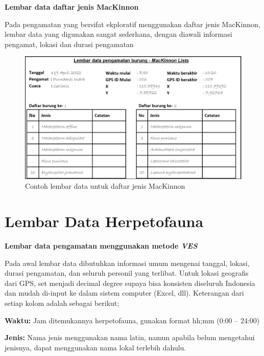 \documentclass[
]{book}
\begin{document}
\textbf{Lembar data daftar jenis MacKinnon}

Pada pengamatan yang bersifat ekploratif menggunakan daftar jenis MacKinnon, lembar data yang digunakan sangat sederhana, dengan diawali informasi pengamat, lokasi dan durasi pengamatan

\begin{figure}

{\centering \includegraphics[width=1\linewidth]{images/ldp_ml} 

}

\caption{Contoh lembar data untuk daftar jenis MacKinnon}\label{fig:ldpml}
\end{figure}

\hypertarget{lembar-data-herpetofauna}{%
\section*{Lembar Data Herpetofauna}\label{lembar-data-herpetofauna}}

\textbf{Lembar data pengamatan menggunakan metode \emph{VES}}

Pada awal lembar data dibutuhkan informasi umum mengenai tanggal, lokasi, durasi pengamatan, dan seluruh personil yang terlibat. Untuk lokasi geografis dari GPS, set menjadi decimal degree supaya bisa konsisten diseluruh Indonesia dan mudah di-input ke dalam sistem computer (Excel, dll). Keterangan dari setiap kolom adalah sebagai berikut;

\textbf{Waktu:} Jam ditemukannya herpetofauna, gunakan format hh;mm (0:00 -- 24:00)

\textbf{Jenis:} Nama jenis menggunakan nama latin, namun apabila belum mengetahui jenisnya, dapat menggunakan nama lokal terlebih dahulu.
\end{document}
